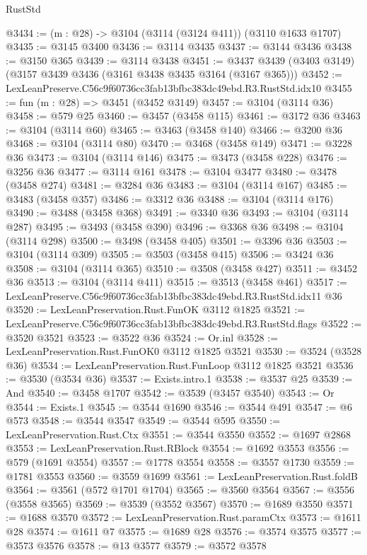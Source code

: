 \begin{lexlean}{RustStd}
\begin{coremodule}
@3434 := (m : @28) -> @3104 (@3114 (@3124 @411)) (@3110 @1633 @1707)
@3435 := @3145 @3400
@3436 := @3114 @3435
@3437 := @3144 @3436
@3438 := @3150 @365
@3439 := @3114 @3438
@3451 := @3437 @3439 (@3403 @3149) (@3157 @3439 @3436 (@3161 @3438 @3435 @3164 (@3167 @365)))
@3452 := LexLeanPreserve.C56c9f60736cc3fab13bfbc383dc49ebd.R3.RustStd.idx10
@3455 := fun (m : @28) => @3451 (@3452 @3149)
@3457 := @3104 (@3114 @36)
@3458 := @579 @25
@3460 := @3457 (@3458 @115)
@3461 := @3172 @36
@3463 := @3104 (@3114 @60)
@3465 := @3463 (@3458 @140)
@3466 := @3200 @36
@3468 := @3104 (@3114 @80)
@3470 := @3468 (@3458 @149)
@3471 := @3228 @36
@3473 := @3104 (@3114 @146)
@3475 := @3473 (@3458 @228)
@3476 := @3256 @36
@3477 := @3114 @161
@3478 := @3104 @3477
@3480 := @3478 (@3458 @274)
@3481 := @3284 @36
@3483 := @3104 (@3114 @167)
@3485 := @3483 (@3458 @357)
@3486 := @3312 @36
@3488 := @3104 (@3114 @176)
@3490 := @3488 (@3458 @368)
@3491 := @3340 @36
@3493 := @3104 (@3114 @287)
@3495 := @3493 (@3458 @390)
@3496 := @3368 @36
@3498 := @3104 (@3114 @298)
@3500 := @3498 (@3458 @405)
@3501 := @3396 @36
@3503 := @3104 (@3114 @309)
@3505 := @3503 (@3458 @415)
@3506 := @3424 @36
@3508 := @3104 (@3114 @365)
@3510 := @3508 (@3458 @427)
@3511 := @3452 @36
@3513 := @3104 (@3114 @411)
@3515 := @3513 (@3458 @461)
@3517 := LexLeanPreserve.C56c9f60736cc3fab13bfbc383dc49ebd.R3.RustStd.idx11 @36
@3520 := LexLeanPreservation.Rust.FunOK @3112 @1825
@3521 := LexLeanPreserve.C56c9f60736cc3fab13bfbc383dc49ebd.R3.RustStd.flags
@3522 := @3520 @3521
@3523 := @3522 @36
@3524 := Or.inl
@3528 := LexLeanPreservation.Rust.FunOK0 @3112 @1825 @3521
@3530 := @3524 (@3528 @36)
@3534 := LexLeanPreservation.Rust.FunLoop @3112 @1825 @3521
@3536 := @3530 (@3534 @36)
@3537 := Exists.intro.{1}
@3538 := @3537 @25
@3539 := And
@3540 := @3458 @1707
@3542 := @3539 (@3457 @3540)
@3543 := Or
@3544 := Exists.{1}
@3545 := @3544 @1690
@3546 := @3544 @491
@3547 := @6 @573
@3548 := @3544 @3547
@3549 := @3544 @595
@3550 := LexLeanPreservation.Rust.Ctx
@3551 := @3544 @3550
@3552 := @1697 @2868
@3553 := LexLeanPreservation.Rust.RBlock
@3554 := @1692 @3553
@3556 := @579 (@1691 @3554)
@3557 := @1778 @3554
@3558 := @3557 @1730
@3559 := @1781 @3553
@3560 := @3559 @1699
@3561 := LexLeanPreservation.Rust.foldB
@3564 := @3561 (@572 @1701 @1704)
@3565 := @3560 @3564
@3567 := @3556 (@3558 @3565)
@3569 := @3539 (@3552 @3567)
@3570 := @1689 @3550
@3571 := @1688 @3570
@3572 := LexLeanPreservation.Rust.paramCtx
@3573 := @1611 @28
@3574 := @1611 @7
@3575 := @1689 @28
@3576 := @3574 @3575
@3577 := @3573 @3576
@3578 := @13 @3577
@3579 := @3572 @3578

\end{coremodule}
\end{lexlean}
